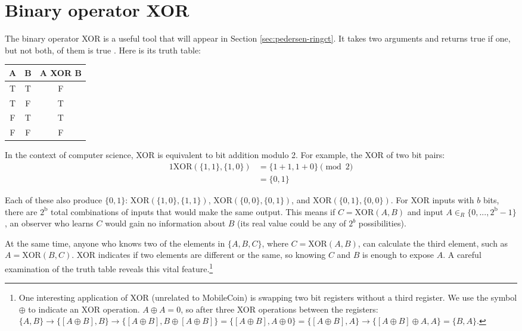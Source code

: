 \section{Binary operator XOR}
\label{sec:XOR_section}

The binary operator XOR is a useful tool that will appear in Section \ref{sec:pedersen-ringct}. It takes two arguments and returns true if one, but not both, of them is true \cite{wolfram-xor}. Here is its truth table:

\begin{center}
    \begin{tabular}{|c|c|c|}
    \hline
        A & B & A XOR B \\
    \hline\hline
        T & T & F \\
    \hline
        T & F & T \\
    \hline
        F & T & T \\
    \hline
        F & F & F \\
    \hline
    \end{tabular}
\end{center}

In the context of computer science, XOR is equivalent to bit addition modulo 2. For example, the XOR of two bit pairs:
\begin{alignat*}{1}
    \text{XOR}(\{1,1\},\{1,0\}) &= \{1+1,1+0\} \pmod 2 \\
                                &= \{0,1\} 
\end{alignat*}

Each of these also produce $\{0,1\}$: $\text{XOR}(\{1,0\},\{1,1\})$, $\text{XOR}(\{0,0\},\{0,1\})$, and $\text{XOR}(\{0,1\},\{0,0\})$. For XOR inputs with $b$ bits, there are $2^{\text{b}}$ total combinations of inputs that would make the same output. This means if $C = \text{XOR}(A,B)$ and input $A \in_R \{0,...,2^{\text{b}}-1\}$, an observer who learns $C$ would gain no information about $B$ (its real value could be any of $2^b$ possibilities).

At the same time, anyone who knows two of the elements in $\{A,B,C\}$, where $C = \text{XOR}(A,B)$, can calculate the third element, such as $A = \text{XOR}(B,C)$. XOR indicates if two elements are different or the same, so knowing $C$ and $B$ is enough to expose $A$. A careful examination of the truth table reveals this vital feature.\footnote{One interesting application of XOR (unrelated to MobileCoin) is swapping two bit registers without a third register. We use the symbol $\oplus$ to indicate an XOR operation. $A \oplus A = 0$, so after three XOR operations between the registers: $\{A, B\} \rightarrow{} \{[A \oplus B], B\} \rightarrow{} \{[A \oplus B], B \oplus [A \oplus B]\} = \{[A \oplus B], A \oplus 0\} = \{[A \oplus B], A\} \rightarrow{} \{[A \oplus B] \oplus A, A\} = \{B, A\}$.}